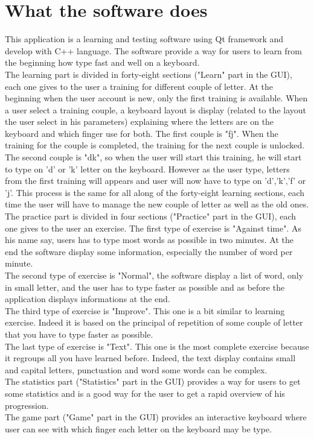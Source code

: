 \section{What the software does}
This application is a learning and testing software using Qt framework and develop with C++ language. The software provide a way for users to learn from the beginning how type fast and well on a keyboard.
\\
The learning part is divided in forty-eight sections ("Learn" part in the GUI), each one gives to the user a training for different couple of letter. At the beginning when the user account is new, only the first training is available. When a user select a training couple, a keyboard layout is display (related to the layout the user select in his parameters) explaining where the letters are on the keyboard and which finger use for both. The first couple is "fj". When the training for the couple is completed, the training for the next couple is unlocked. The second couple is "dk", so when the user will start this training, he will start to type on 'd' or 'k' letter on the keyboard. However as the user type, letters from the first training will appears and user will now have to type on 'd','k','f' or 'j'. This process is the same for all along of the forty-eight learning sections, each time the user will have to manage the new couple of letter as well as the old ones.
\\
The practice part is divided in four sections ("Practice" part in the GUI), each one gives to the user an exercise. The first type of exercise is "Against time". As his name say, users has to type most words as possible in two minutes. At the end the software display some information, especially the number of word per minute.\\
The second type of exercise is "Normal", the software display a list of word, only in small letter, and the user has to type faster as possible and as before the application displays informations at the end.\\
The third type of exercise is "Improve". This one is a bit similar to learning exercise. Indeed it is based on the principal of repetition of some couple of letter that you have to type faster as possible.\\
The last type of exercise is "Text". This one is the most complete exercise because it regroups all you have learned before. Indeed, the text display contains small and capital letters, punctuation and word some words can be complex.
\\
The statistics part ("Statistics" part in the GUI) provides a way for users to get some statistics and is a good way for the user to get a rapid overview of his progression.
\\
The game part ("Game" part in the GUI) provides an interactive keyboard where user can see with which finger each letter on the keyboard may be type.
          

